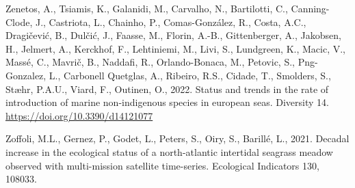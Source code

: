 \documentclass[
  letterpaper,
  DIV=11,
  numbers=noendperiod]{scrartcl}
\newlength{\cslhangindent}
\newenvironment{CSLReferences}[2] %
 {\begin{list}{}{%
  \setlength{\itemindent}{0pt}
  \setlength{\leftmargin}{0pt}
  \setlength{\parsep}{0pt}
  \ifodd #1
   \setlength{\leftmargin}{\cslhangindent}
   \setlength{\itemindent}{-1\cslhangindent}
  \fi
  \setlength{\itemsep}{#2\baselineskip}}}
 {\end{list}}
\begin{document}
\begin{CSLReferences}{1}{0}
Zenetos, A., Tsiamis, K., Galanidi, M., Carvalho, N., Bartilotti, C.,
Canning-Clode, J., Castriota, L., Chainho, P., Comas-González, R.,
Costa, A.C., Dragičević, B., Dulčić, J., Faasse, M., Florin, A.-B.,
Gittenberger, A., Jakobsen, H., Jelmert, A., Kerckhof, F., Lehtiniemi,
M., Livi, S., Lundgreen, K., Macic, V., Massé, C., Mavrič, B., Naddafi,
R., Orlando-Bonaca, M., Petovic, S., Png-Gonzalez, L., Carbonell
Quetglas, A., Ribeiro, R.S., Cidade, T., Smolders, S., Stæhr, P.A.U.,
Viard, F., Outinen, O., 2022. Status and trends in the rate of
introduction of marine non-indigenous species in european seas.
Diversity 14. \url{https://doi.org/10.3390/d14121077}

Zoffoli, M.L., Gernez, P., Godet, L., Peters, S., Oiry, S., Barillé, L.,
2021. Decadal increase in the ecological status of a north-atlantic
intertidal seagrass meadow observed with multi-mission satellite
time-series. Ecological Indicators 130, 108033.

\end{CSLReferences}
\end{document}
